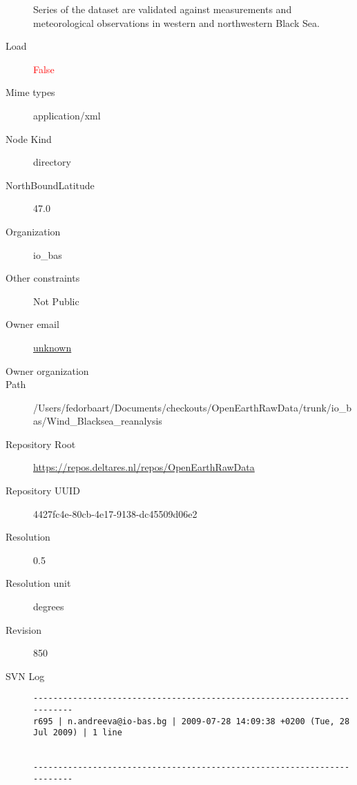 \documentclass[9]{report}
\begin{document}
\begin{description}
Series of the dataset are validated against measurements and meteorological observations in western and northwestern Black Sea.
  \item[Load] \textcolor{red}{False}
  \item[Mime types] application/xml
  \item[Node Kind] directory
  \item[NorthBoundLatitude] 47.0
  \item[Organization] io\_bas
  \item[Other constraints] Not Public
  \item[Owner email] \href{mailto:unknown}{unknown}
  \item[Owner organization] 
  \item[Path] /Users/fedorbaart/Documents/checkouts/OpenEarthRawData/trunk/io\_bas/Wind\_Blacksea\_reanalysis
  \item[Repository Root] \href{https://repos.deltares.nl/repos/OpenEarthRawData}{https://repos.deltares.nl/repos/OpenEarthRawData}
  \item[Repository UUID] 4427fc4e-80cb-4e17-9138-dc45509d06e2
  \item[Resolution] 0.5
  \item[Resolution unit] degrees
  \item[Revision] 850
  \item[SVN Log] \begin{verbatim}
------------------------------------------------------------------------
r695 | n.andreeva@io-bas.bg | 2009-07-28 14:09:38 +0200 (Tue, 28 Jul 2009) | 1 line


------------------------------------------------------------------------


\end{verbatim}
\end{description}
\end{document}
